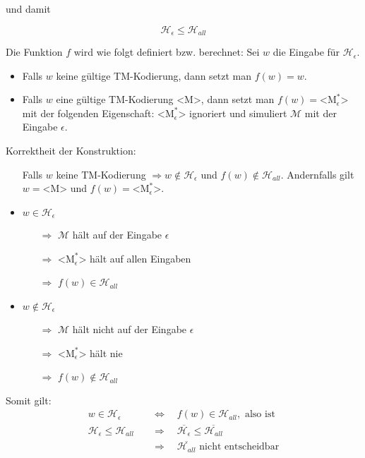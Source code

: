 \documentclass{scrartcl}%
\begin{document}
    und damit

    \begin{equation*}
        \mathcal{H}_\epsilon \leq \mathcal{H}_{all}
    \end{equation*}

    Die Funktion $f$ wird wie folgt definiert bzw. berechnet: Sei $w$ die Eingabe für $\mathcal{H}_\epsilon$.
    \begin{itemize}
        \item Falls $w$ keine gültige TM-Kodierung, dann setzt man $f(w) = w$.
        \item Falls $w$ eine gültige TM-Kodierung <M>, dann setzt man $f(w) = \text{<M}^{*}_\epsilon\text{>}$ mit der folgenden Eigenschaft:
        $\text{<M}^{*}_\epsilon\text{>}$ ignoriert und simuliert $\mathcal{M}$ mit der Eingabe $\epsilon$.
    \end{itemize}

    Korrektheit der Konstruktion:
    \begin{itemize}
        \item [] Falls $w$ keine TM-Kodierung $\Rightarrow w \notin \mathcal{H}_\epsilon$ und $f(w) \notin \mathcal{H}_{all}$.\newline
        Andernfalls gilt $w=$<M> und $f(w)=\text{<M}^{*}_\epsilon\text{>}$.
        \item $w \in \mathcal{H}_\epsilon$
        \begin{itemize}
            \item [$\Rightarrow$] $\mathcal{M}$ hält auf der Eingabe $\epsilon$
            \item [$\Rightarrow$] $\text{<M}^{*}_\epsilon\text{>}$ hält auf allen Eingaben
            \item [$\Rightarrow$] $f(w) \in \mathcal{H}_{all}$
        \end{itemize}
        \item $w \notin \mathcal{H}_\epsilon$
        \begin{itemize}
            \item [$\Rightarrow$] $\mathcal{M}$ hält nicht auf der Eingabe $\epsilon$
            \item [$\Rightarrow$] $\text{<M}^{*}_\epsilon\text{>}$ hält nie
            \item [$\Rightarrow$] $f(w) \notin \mathcal{H}_{all}$
        \end{itemize}
    \end{itemize}

    Somit gilt:
    \begin{align*}
        w \in \mathcal{H}_{\epsilon} & \quad \Leftrightarrow \quad  f(w) \in \mathcal{H}_{all}, \text{ also ist} \\
        \mathcal{H}_{\epsilon} \leq \mathcal{H}_{all} & \quad \Rightarrow \quad  \overline{\mathcal{H}_{\epsilon}} \leq \overline{\mathcal{H}_{all}}\\
        & \quad \Rightarrow \quad  \overline{\mathcal{H}_{all}} \text{ nicht entscheidbar}\\
    \end{align*}\proofend
\end{document}
